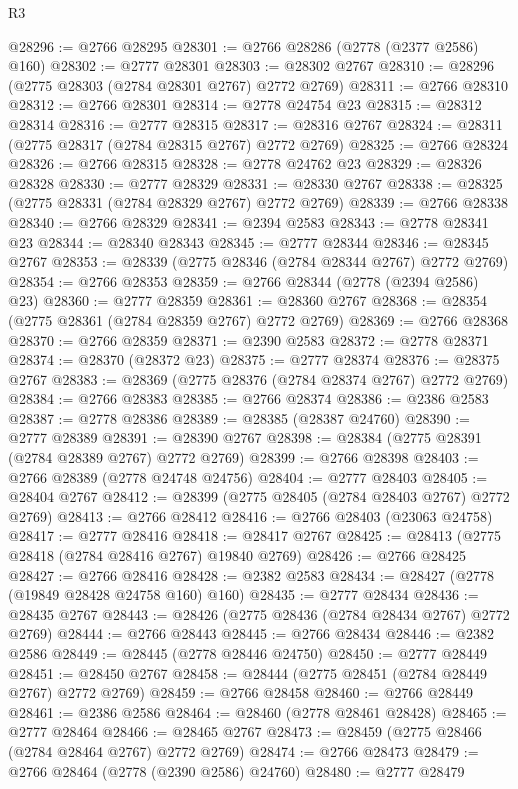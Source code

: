 \begin{lexlean}{R3}
\begin{coremodule}
@28296 := @2766 @28295
@28301 := @2766 @28286 (@2778 (@2377 @2586) @160)
@28302 := @2777 @28301
@28303 := @28302 @2767
@28310 := @28296 (@2775 @28303 (@2784 @28301 @2767) @2772 @2769)
@28311 := @2766 @28310
@28312 := @2766 @28301
@28314 := @2778 @24754 @23
@28315 := @28312 @28314
@28316 := @2777 @28315
@28317 := @28316 @2767
@28324 := @28311 (@2775 @28317 (@2784 @28315 @2767) @2772 @2769)
@28325 := @2766 @28324
@28326 := @2766 @28315
@28328 := @2778 @24762 @23
@28329 := @28326 @28328
@28330 := @2777 @28329
@28331 := @28330 @2767
@28338 := @28325 (@2775 @28331 (@2784 @28329 @2767) @2772 @2769)
@28339 := @2766 @28338
@28340 := @2766 @28329
@28341 := @2394 @2583
@28343 := @2778 @28341 @23
@28344 := @28340 @28343
@28345 := @2777 @28344
@28346 := @28345 @2767
@28353 := @28339 (@2775 @28346 (@2784 @28344 @2767) @2772 @2769)
@28354 := @2766 @28353
@28359 := @2766 @28344 (@2778 (@2394 @2586) @23)
@28360 := @2777 @28359
@28361 := @28360 @2767
@28368 := @28354 (@2775 @28361 (@2784 @28359 @2767) @2772 @2769)
@28369 := @2766 @28368
@28370 := @2766 @28359
@28371 := @2390 @2583
@28372 := @2778 @28371
@28374 := @28370 (@28372 @23)
@28375 := @2777 @28374
@28376 := @28375 @2767
@28383 := @28369 (@2775 @28376 (@2784 @28374 @2767) @2772 @2769)
@28384 := @2766 @28383
@28385 := @2766 @28374
@28386 := @2386 @2583
@28387 := @2778 @28386
@28389 := @28385 (@28387 @24760)
@28390 := @2777 @28389
@28391 := @28390 @2767
@28398 := @28384 (@2775 @28391 (@2784 @28389 @2767) @2772 @2769)
@28399 := @2766 @28398
@28403 := @2766 @28389 (@2778 @24748 @24756)
@28404 := @2777 @28403
@28405 := @28404 @2767
@28412 := @28399 (@2775 @28405 (@2784 @28403 @2767) @2772 @2769)
@28413 := @2766 @28412
@28416 := @2766 @28403 (@23063 @24758)
@28417 := @2777 @28416
@28418 := @28417 @2767
@28425 := @28413 (@2775 @28418 (@2784 @28416 @2767) @19840 @2769)
@28426 := @2766 @28425
@28427 := @2766 @28416
@28428 := @2382 @2583
@28434 := @28427 (@2778 (@19849 @28428 @24758 @160) @160)
@28435 := @2777 @28434
@28436 := @28435 @2767
@28443 := @28426 (@2775 @28436 (@2784 @28434 @2767) @2772 @2769)
@28444 := @2766 @28443
@28445 := @2766 @28434
@28446 := @2382 @2586
@28449 := @28445 (@2778 @28446 @24750)
@28450 := @2777 @28449
@28451 := @28450 @2767
@28458 := @28444 (@2775 @28451 (@2784 @28449 @2767) @2772 @2769)
@28459 := @2766 @28458
@28460 := @2766 @28449
@28461 := @2386 @2586
@28464 := @28460 (@2778 @28461 @28428)
@28465 := @2777 @28464
@28466 := @28465 @2767
@28473 := @28459 (@2775 @28466 (@2784 @28464 @2767) @2772 @2769)
@28474 := @2766 @28473
@28479 := @2766 @28464 (@2778 (@2390 @2586) @24760)
@28480 := @2777 @28479

\end{coremodule}
\end{lexlean}
